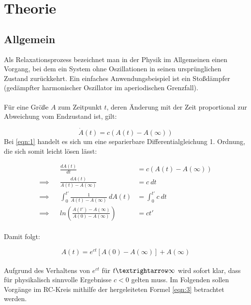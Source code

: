 \section{Theorie}
\label{sec:Theorie}

\subsection{Allgemein}
Als Relaxationsprozess bezeichnet man in der Physik im Allgemeinen einen Vorgang, bei dem ein System ohne Oszillationen in seinen ursprünglichen Zustand zurückkehrt. Ein einfaches Anwendungsbeispiel ist ein Stoßdämpfer (gedämpfter harmonischer Oszillator im aperiodischen Grenzfall).\\ \\
Für eine  Größe $A$ zum Zeitpunkt $t$, deren Änderung mit der Zeit proportional zur Abweichung vom Endzustand ist, gilt:

\begin{equation}
\label{eqn:1}
\dot{A}(t) = c\left(A(t) - A(\infty)\right)
\end{equation}
Bei \eqref{eqn:1} handelt es sich um eine separierbare Differentialgleichung 1. Ordnung, die sich somit leicht lösen lässt:

\begin{equation}
\label{eqn:2}
\begin{alignedat}{2}
&&\frac{dA(t)}{dt} &= c(A(t) - A(\infty))
\\
\implies &&\frac{dA(t)}{A(t) - A(\infty)} &= c \ dt
\\
\implies &&\int_0^{t'} \frac{1}{A(t)-A(\infty)} \ dA(t) &= \int_0^{t'}c \ dt \\
\implies && ln\left(\frac{A(t') - A(\infty)}{A(0)-A(\infty)}\right) &= ct'
\end{alignedat}
\end{equation}\\

Damit folgt:

\begin{equation}
\label{eqn:3}
A(t) = e^{ct} \left[A(0)-A(\infty)\right] + A(\infty)
\end{equation}\\
Aufgrund des Verhaltens von $e^{ct}$ für $t \textrightarrow \infty$ wird sofort klar, dass für physikalisch sinnvolle Ergebnisse $c < 0$ gelten muss.
Im Folgenden sollen Vorgänge im RC-Kreis mithilfe der hergeleiteten Formel \eqref{eqn:3} betrachtet werden.
\newpage
